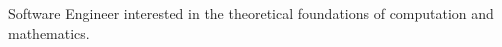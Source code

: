 \begin{cvparagraph}

Software Engineer interested in the theoretical foundations of computation and mathematics.
\end{cvparagraph}
